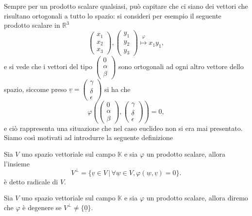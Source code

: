 Sempre per un prodotto scalare qualsiasi, può capitare che ci siano dei vettori che risultano ortogonali a tutto lo spazio: si consideri per esempio il seguente prodotto scalare in $\mathbb{R}^3$
$$
	\begin{pmatrix}
		x_1 \\
		x_2 \\
		x_3
	\end{pmatrix}, \begin{pmatrix}
		y_1 \\
		y_2 \\
		y_3
	\end{pmatrix} \stackrel{\varphi}{\mapsto} x_1 y_1,
$$
e si vede che i vettori del tipo $\begin{pmatrix}
	0 \\
	\alpha \\
	\beta
\end{pmatrix}$ sono ortogonali ad ogni altro vettore dello spazio, siccome preso $\underline{v} = \begin{pmatrix}
	\gamma \\
	\delta \\
	\epsilon
\end{pmatrix}$ si ha che
$$
	\varphi(\begin{pmatrix}
		0 \\
		\alpha \\
		\beta
	\end{pmatrix}, \begin{pmatrix}
		\gamma \\
		\delta \\
		\epsilon
	\end{pmatrix}) = 0,
$$
e ciò rappresenta una situazione che nel caso euclideo non si era mai presentato. Siamo così motivati ad introdurre la seguente definizione
\begin{definition}[radicale]
	Sia $V$ uno spazio vettoriale sul campo $\mathbb{K}$ e sia $\varphi$ un prodotto scalare, allora l'insieme
	$$
		V^\perp = \{ \underline{v} \in V \, \big| \, \forall \underline{w} \in V, \varphi(\underline{w}, \underline{v}) = 0 \}.
	$$
	è detto radicale di $V$.
\end{definition}
\begin{definition}
	Sia $V$ uno spazio vettoriale sul campo $\mathbb{K}$ e sia $\varphi$ un prodotto scalare, allora diremo che $\varphi$ è degenere se $V^\perp \neq \{ \underline{0} \}$.
\end{definition}


